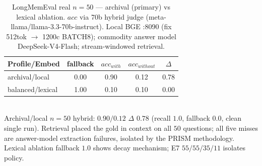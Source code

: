 \begin{table}[t]\centering\caption{LongMemEval real $n{=}50$ — archival (primary) vs lexical ablation. $acc$ via 70b hybrid judge (meta-llama/llama-3.3-70b-instruct). Local BGE :8090 (fix 512tok $\to$ 1200c BATCH8); commodity answer model DeepSeek-V4-Flash; stream-windowed retrieval.}\label{tab:lme50}
\begin{tabular}{lcccc}\toprule
Profile/Embed & fallback & $acc_{with}$ & $acc_{without}$ & $\Delta$ \\ \midrule
archival/local & 0.00 & 0.90 & 0.12 & 0.78 \\
balanced/lexical & 1.00 & 0.10 & 0.10 & 0.00 \\
\bottomrule\end{tabular}
\\{\footnotesize Archival/local $n{=}50$ hybrid: $0.90/0.12$ $\Delta$ $0.78$ (recall $1.0$, fallback $0.0$, clean single run). Retrieval placed the gold in context on all $50$ questions; all five misses are answer-model extraction failures, isolated by the PRISM methodology. Lexical ablation fallback $1.0$ shows decay mechanism; E7 $55/55/35/11$ isolates policy.}
\end{table}